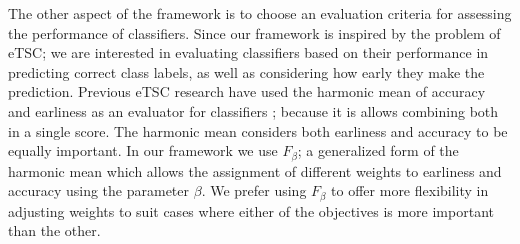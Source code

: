 The other aspect of the framework is to choose an evaluation criteria for assessing the performance of classifiers.
Since our framework is inspired by the problem of eTSC; we are interested in evaluating classifiers based on their performance in predicting correct class labels, as well as considering how early they make the prediction.
Previous eTSC research have used the harmonic mean of accuracy and earliness as an evaluator for classifiers \cite{schafer2020teaser}; because it is allows combining both in a single score.
The harmonic mean considers both earliness and accuracy to be equally important.
In our framework we use $F_{\beta}$; a generalized form of the harmonic mean which allows the assignment of different weights to earliness and accuracy using the parameter $\beta$.
We prefer using $F_{\beta}$ to offer more flexibility in adjusting weights to suit cases where either of the objectives is more important than the other.




